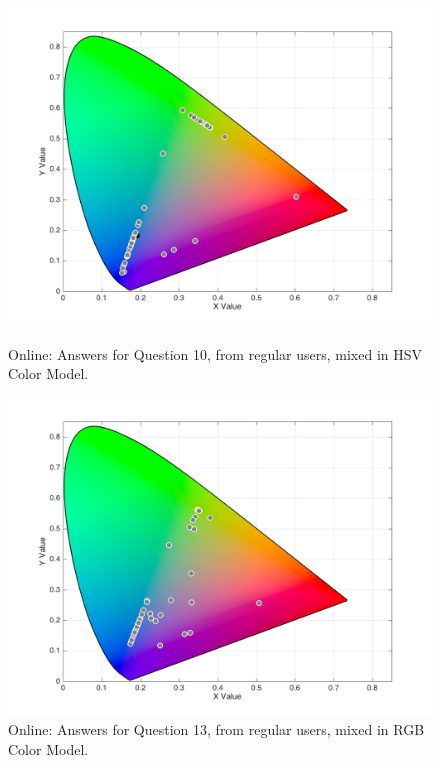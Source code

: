 \begin{figure}[htbp]
  \centering
  \vspace{-15pt}
  \begin{minipage}{0.4\textwidth}
    \centering
    \includegraphics[width=\textwidth]{images/results/10_online_HSVresponses.png}
    \caption[Online: Answers for Question 10, from regular users, mixed in HSV Color Model.]{Online: Answers for Question 10, from regular users, mixed in HSV Color Model.}
    \label{fig:onlinehsvregular_10}
  \end{minipage}
  \begin{minipage}{0.4\textwidth}
    \centering
    \includegraphics[width=\textwidth]{images/results/13_online_RGBresponses.png}
    \caption[Online: Answers for Question 13, from regular users, mixed in RGB Color Model.]{Online: Answers for Question 13, from regular users, mixed in RGB Color Model.}
    \label{fig:onlinehsvregular_13}
  \end{minipage}
  \vspace{-5pt}
\end{figure}
%
